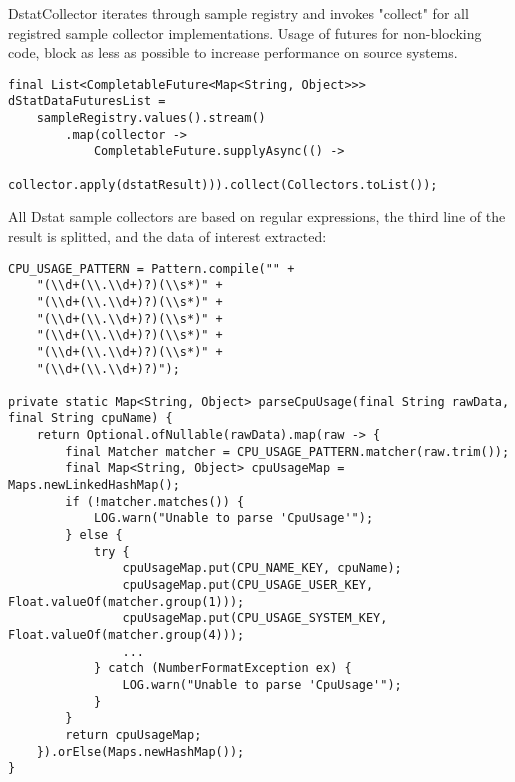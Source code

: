DstatCollector iterates through sample registry and invokes "collect" for all registred sample collector implementations.
Usage of futures for non-blocking code, block as less as possible to increase performance on source systems.
\begin{lstlisting}[caption={Iterate sample registry in "DstatCollector"}, captionpos=b, label={lst:dstatiterate}]
final List<CompletableFuture<Map<String, Object>>> dStatDataFuturesList =
    sampleRegistry.values().stream()
        .map(collector ->
            CompletableFuture.supplyAsync(() ->
                collector.apply(dstatResult))).collect(Collectors.toList());
\end{lstlisting}

All Dstat sample collectors are based on regular expressions, the third line of the result is splitted, and the data of interest
extracted:
\begin{lstlisting}[caption={Extract sample date in  "CpuSampleCollector"}, captionpos=b, label={lst:cpusamplecollector}]
CPU_USAGE_PATTERN = Pattern.compile("" +
    "(\\d+(\\.\\d+)?)(\\s*)" +
    "(\\d+(\\.\\d+)?)(\\s*)" +
    "(\\d+(\\.\\d+)?)(\\s*)" +
    "(\\d+(\\.\\d+)?)(\\s*)" +
    "(\\d+(\\.\\d+)?)(\\s*)" +
    "(\\d+(\\.\\d+)?)");

private static Map<String, Object> parseCpuUsage(final String rawData, final String cpuName) {
    return Optional.ofNullable(rawData).map(raw -> {
        final Matcher matcher = CPU_USAGE_PATTERN.matcher(raw.trim());
        final Map<String, Object> cpuUsageMap = Maps.newLinkedHashMap();
        if (!matcher.matches()) {
            LOG.warn("Unable to parse 'CpuUsage'");
        } else {
            try {
                cpuUsageMap.put(CPU_NAME_KEY, cpuName);
                cpuUsageMap.put(CPU_USAGE_USER_KEY, Float.valueOf(matcher.group(1)));
                cpuUsageMap.put(CPU_USAGE_SYSTEM_KEY, Float.valueOf(matcher.group(4)));
                ...
            } catch (NumberFormatException ex) {
                LOG.warn("Unable to parse 'CpuUsage'");
            }
        }
        return cpuUsageMap;
    }).orElse(Maps.newHashMap());
}
\end{lstlisting}


